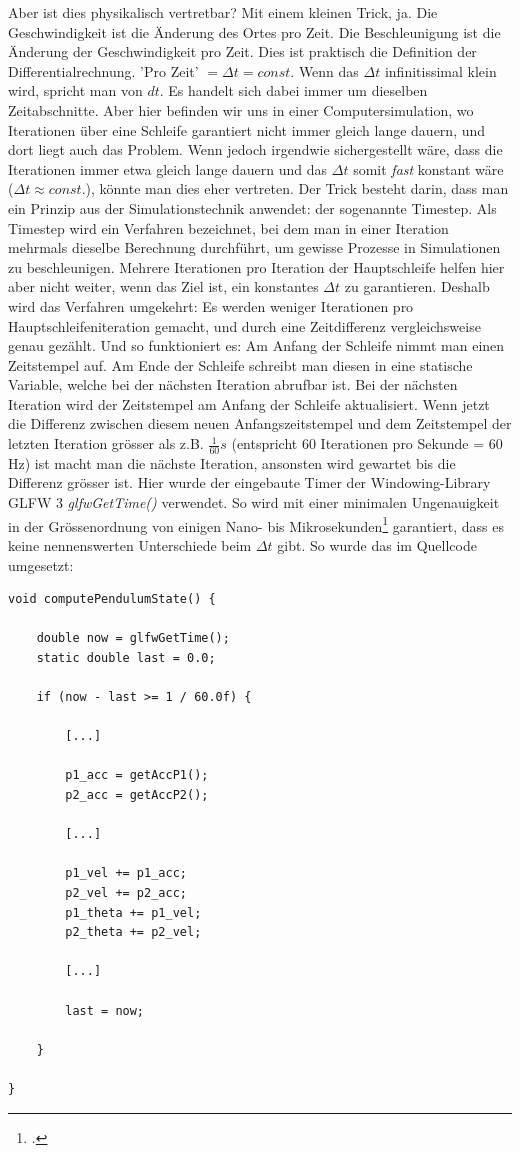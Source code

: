 \documentclass[titlepage, 11pt, a4paper, ngerman]{article}
\begin{document}
Aber ist dies physikalisch vertretbar? Mit einem kleinen Trick, ja. Die Geschwindigkeit ist die Änderung des Ortes pro Zeit. Die Beschleunigung ist die Änderung der Geschwindigkeit pro Zeit. Dies ist praktisch die Definition der Differentialrechnung. 'Pro Zeit' $ = \Delta t = const.$ Wenn das $\Delta t$ infinitissimal klein wird, spricht man von $dt$. Es handelt sich dabei immer um dieselben Zeitabschnitte. Aber hier befinden wir uns in einer Computersimulation, wo Iterationen über eine Schleife garantiert nicht immer gleich lange dauern, und dort liegt auch das Problem. Wenn jedoch irgendwie sichergestellt wäre, dass die Iterationen immer etwa gleich lange dauern und das $\Delta t$ somit \textit{fast} konstant wäre ($\Delta t \approx const.$), könnte man dies eher vertreten. Der Trick besteht darin, dass man ein Prinzip aus der Simulationstechnik anwendet: der sogenannte Timestep. Als Timestep wird ein Verfahren bezeichnet, bei dem man in einer Iteration mehrmals dieselbe Berechnung durchführt, um gewisse Prozesse in Simulationen zu beschleunigen. Mehrere Iterationen pro Iteration der Hauptschleife helfen hier aber nicht weiter, wenn das Ziel ist, ein konstantes $\Delta t$ zu garantieren. Deshalb wird das Verfahren umgekehrt: Es werden weniger Iterationen pro Hauptschleifeniteration gemacht, und durch eine Zeitdifferenz vergleichsweise genau gezählt. Und so funktioniert es: Am Anfang der Schleife nimmt man einen Zeitstempel auf. Am Ende der Schleife schreibt man diesen in eine statische Variable, welche bei der nächsten Iteration abrufbar ist. Bei der nächsten Iteration wird der Zeitstempel am Anfang der Schleife aktualisiert. Wenn jetzt die Differenz zwischen diesem neuen Anfangszeitstempel und dem Zeitstempel der letzten Iteration grösser als z.B. $\frac{1}{60} s$ (entspricht 60 Iterationen pro Sekunde = 60 Hz) ist macht man die nächste Iteration, ansonsten wird gewartet bis die Differenz grösser ist. Hier wurde der eingebaute Timer der Windowing-Library \acrshort{GLFW} 3 \textit{glfwGetTime()} verwendet. So wird mit einer minimalen Ungenauigkeit in der Grössenordnung von einigen Nano- bis Mikrosekunden\footcite{glfwGetTimeDoc} garantiert, dass es keine nennenswerten Unterschiede beim $\Delta t$ gibt. So wurde das im Quellcode umgesetzt:
\begin{verbatim}
void computePendulumState() {

    double now = glfwGetTime();
    static double last = 0.0;

    if (now - last >= 1 / 60.0f) {

        [...]

        p1_acc = getAccP1();
        p2_acc = getAccP2();

        [...]

        p1_vel += p1_acc;
        p2_vel += p2_acc;
        p1_theta += p1_vel;
        p2_theta += p2_vel;

        [...]

        last = now;

    }

}
\end{verbatim}
\end{document}
